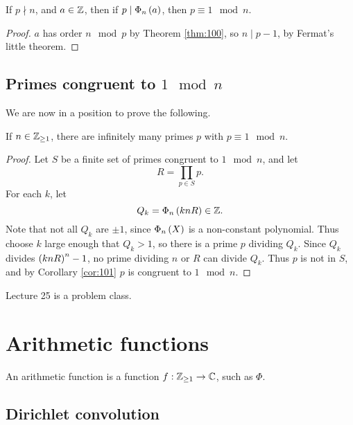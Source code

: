 \begin{corollary}
\label{cor:101}
If $ p \nmid n $, and $ a \in \mathbb{Z} $, then if $ p \mid \Phi_n\left( a \right) $, then $ p \equiv 1 \mod n $.
\end{corollary}

\begin{proof}
$ a $ has order $ n \mod p $ by Theorem \ref{thm:100}, so $ n \mid p - 1 $, by Fermat's little theorem.
\end{proof}

\subsection{Primes congruent to $ 1 \mod n $}

We are now in a position to prove the following.

\begin{theorem}
If $ n \in \mathbb{Z}_{\ge 1} $, there are infinitely many primes $ p $ with $ p \equiv 1 \mod n $.
\end{theorem}

\begin{proof}
Let $ S $ be a finite set of primes congruent to $ 1 \mod n $, and let
$$ R = \prod_{p \in S} p. $$
For each $ k $, let
$$ Q_k = \Phi_n\left( knR \right) \in \mathbb{Z}. $$
Note that not all $ Q_k $ are $ \pm 1 $, since $ \Phi_n\left( X \right) $ is a non-constant polynomial. Thus choose $ k $ large enough that $ Q_k > 1 $, so there is a prime $ p $ dividing $ Q_k $. Since $ Q_k $ divides $ \left( knR \right)^n - 1 $, no prime dividing $ n $ or $ R $ can divide $ Q_k $. Thus $ p $ is not in $ S $, and by Corollary \ref{cor:101} $ p $ is congruent to $ 1 \mod n $.
\end{proof}


Lecture 25 is a problem class.

\pagebreak


\section{Arithmetic functions}

An arithmetic function is a function $ f : \mathbb{Z}_{\ge 1} \to \mathbb{C} $, such as $ \Phi $.

\subsection{Dirichlet convolution}

